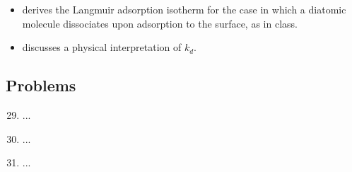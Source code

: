 \documentclass[../notes.tex]{subfiles}
\begin{document}
\begin{itemize}
\begin{itemize}
\begin{equation*}
        \end{equation*}
        \item Substituting this into the Langmuir adsorption isotherm and rearranging gives
        \begin{equation*}
            \frac{1}{V} = \frac{1}{PbV_m}+\frac{1}{V_m}
        \end{equation*}
        \item It follows that a plot of $1/V$ vs. $1/P$ will have slope $1/bV_m$ and $y$-intercept $1/V_m$.
        \item From a line of best fit, we can thus determine that $V_m=\SI{3.96e-8}{\cubic\meter}$ and $b=\SI{2.14e12}{\per\torr}$.
        \item Since \SI{1}{\mole} of gas occupies $\SI{22.4}{\liter}=\SI{2.24e-2}{\cubic\meter}$ at STP, the number of moles of gas in $V_m$ is
        \begin{equation*}
            \frac{\SI{3.96e-8}{\cubic\meter}}{\SI{2.24e-2}{\cubic\meter\per\mole}} = \SI{1.77e-6}{\mole}
        \end{equation*}
        which corresponds to
        \begin{equation*}
            (\SI{1.77e-6}{\mole})\NA = \SI{1.06e18}{\molecule}
        \end{equation*}
        \item Since each molecule of gas occupies a single surface site, it follows that there are \num{1.06e18} total surface sites.
    \end{itemize}
    \item \textcite{bib:McQuarrieSimon} derives the Langmuir adsorption isotherm for the case in which a diatomic molecule dissociates upon adsorption to the surface, as in class.
    \item \textcite{bib:McQuarrieSimon} discusses a physical interpretation of $k_d$.
\end{itemize}


\subsection*{Problems}
\begin{enumerate}[label={\textbf{31-\arabic*.}},ref={31-\arabic*},leftmargin=3.5em]
    \setcounter{enumi}{28}
    \item \label{prb:31-29}...
    \setcounter{enumi}{43}
    \item \label{prb:31-44}...
    \item \label{prb:31-45}...
\end{enumerate}
\end{document}
